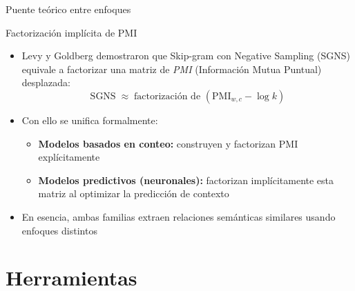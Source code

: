 \documentclass[handout]{beamer}
\begin{document}
\begin{frame}{Puente teórico entre enfoques \cite{levy2014neural}}
  \begin{alertblock}{Factorización implícita de PMI}
    \begin{itemize}
      \item Levy y Goldberg demostraron que Skip-gram con Negative Sampling (SGNS) equivale a factorizar una matriz de \emph{PMI} (Información Mutua Puntual) desplazada:
      \[
        \text{SGNS} \;\approx\; \text{factorización de }(\mathrm{PMI}_{w,c} - \log k)
      \]
      \item Con ello se unifica formalmente:
        \begin{itemize}
          \item \textbf{Modelos basados en conteo:} construyen y factorizan \(\mathrm{PMI}\) explícitamente
          \item \textbf{Modelos predictivos (neuronales):} factorizan implícitamente esta matriz al optimizar la predicción de contexto
        \end{itemize}
      \item En esencia, ambas familias extraen relaciones semánticas similares usando enfoques distintos
    \end{itemize}
  \end{alertblock}
\end{frame}


\section{Herramientas}
\end{document}

